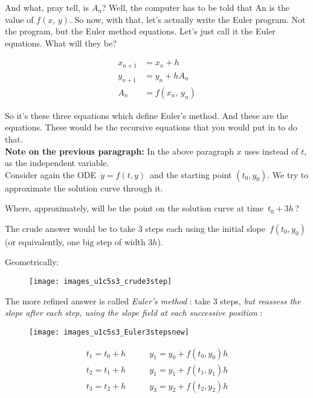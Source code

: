 And what, pray tell, is $A_n$?
Well, the computer has to be told that An is the value of $f(x, \, y)$.
So now, with that, let's actually write the Euler program.
Not the program, but the Euler method equations.
Let's just call it the Euler equations.
What will they be?

\begin{align*}
  x_{n + 1} &= x_n + h \\
  y_{n+1} &= y_n + h A_n \\
  A_n &= f(x_n, \, y_n)
\end{align*}

So it's these three equations which define Euler's method.
And these are the equations.
These would be the recursive equations that you would put in to do that. \\

\textbf{\color{orange}Note on the previous paragraph:}
In the above paragraph $x$ uses instead of $t$, as the independent variable. \\

Consider again the ODE $\, \dot y = f(t,y) \,$ and the starting point $(t_0 , y_0)$.
We try to approximate the solution curve through it.

\begin{question}
  Where, approximately, will be the point on the solution curve at
  time $\, t_0 + 3h \,$?
\end{question}

The crude answer would be to take $3$ steps each using the initial slope
$\, f(t_0, y_0) \,$ (or equivalently, one big step of width $3h$).

\clearpage

Geometrically:

\begin{figure}[ht!]
  \centering
  \texttt{[image: images\_u1c5s3\_crude3step]}
\end{figure}

The more refined answer is called \emph{\color{blue}Euler's method} :
take $3$ steps, \emph{but reassess the slope after each step, using the slope field at each successive position} :

\begin{figure}[ht!]
  \centering
  \texttt{[image: images\_u1c5s3\_Euler3stepsnew]}
\end{figure}

\begin{align*}
  t_1 = t_0 + h & \qquad y_1 = y_0 + f(t_0, y_0)h \\
  t_2 = t_1 + h & \qquad y_1 = y_1 + f(t_1, y_1)h \\
  t_3 = t_2 + h & \qquad y_3 = y_2 + f(t_2, y_2)h 
\end{align*}

